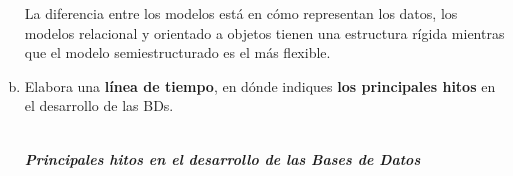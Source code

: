 \documentclass[letterpaper,12pt]{article}
\begin{document}
\begin{enumerate}[a. ]
\begin{itemize}
          \end{itemize}

          La diferencia entre los modelos está en cómo representan los datos, los modelos relacional y orientado a objetos tienen una estructura rígida mientras que el modelo semiestructurado es el más flexible.\\

            \item Elabora una \textbf{línea de tiempo}, en dónde indiques \textbf{los principales hitos} en el desarrollo de las BDs.\\\\
          {\Large\itshape \textbf{Principales hitos en el desarrollo de las Bases de Datos} \par}
          \vspace{.5cm}
          \vfill



\end{enumerate}
\end{document}
